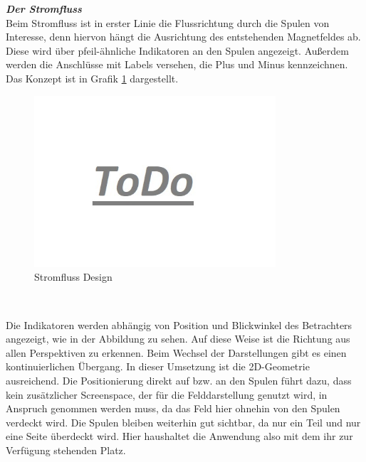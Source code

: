 \textbf{\textit{Der Stromfluss}}\\
Beim Stromfluss ist in erster Linie die Flussrichtung durch die Spulen von Interesse, denn hiervon hängt die Ausrichtung des entstehenden Magnetfeldes ab. Diese wird über pfeil-ähnliche Indikatoren an den Spulen angezeigt. Außerdem werden die Anschlüsse mit Labels versehen, die Plus und Minus kennzeichnen. Das Konzept ist in Grafik \ref{img:current-design} dargestellt.

\begin{figure}[h!]
	\centering
	\includegraphics[width=0.8\textwidth]{images/todo.jpg}
	\caption{Stromfluss Design}
	\label{img:current-design}
\end{figure}


\vspace{8px}
\begin{center}
	\\
\end{center}
\vspace{6px}

Die Indikatoren werden abhängig von Position und Blickwinkel des Betrachters angezeigt, wie in der Abbildung zu sehen. Auf diese Weise ist die Richtung aus allen Perspektiven zu erkennen. Beim Wechsel der Darstellungen gibt es einen kontinuierlichen Übergang. In dieser Umsetzung ist die 2D-Geometrie ausreichend. Die Positionierung direkt auf bzw. an den Spulen führt dazu, dass kein zusätzlicher Screenspace, der für die Felddarstellung genutzt wird, in Anspruch genommen werden muss, da das Feld hier ohnehin von den Spulen verdeckt wird. Die Spulen bleiben weiterhin gut sichtbar, da nur ein Teil und nur eine Seite überdeckt wird. Hier haushaltet die Anwendung also mit dem ihr zur Verfügung stehenden Platz.\\

